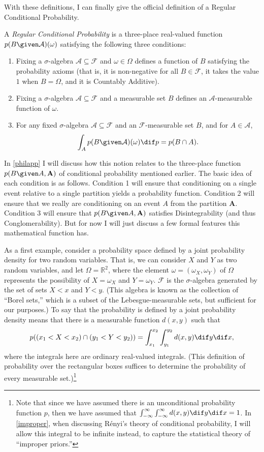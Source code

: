 With these definitions, I can finally give the official definition of a Regular Conditional Probability.
\begin{definition}\label{rcd}
A \emph{Regular Conditional Probability} is a three-place real-valued function $p(B \given \mathcal{A})(\omega)$ satisfying the following three conditions:\begin{enumerate}
\item Fixing a $\sigma$-algebra $\mathcal{A}\subseteq\mathcal{F}$ and $\omega\in\Omega$ defines a function of $B$ satisfying the probability axioms (that is, it is non-negative for all $B\in\mathcal{F}$, it takes the value $1$ when $B=\Omega$, and it is Countably Additive).
\item Fixing a $\sigma$-algebra $\mathcal{A}\subseteq\mathcal{F}$ and a measurable set $B$ defines an $\mathcal{A}$-measurable function of $\omega$.
\item For any fixed $\sigma$-algebra $\mathcal{A}\subseteq\mathcal{F}$ and an $\mathcal{F}$-measurable set $B$, and for $A\in\mathcal{A}$, $$\int_A p(B \given \mathcal{A})(\omega) \dif p=p(B\cap A).$$
\end{enumerate}
\end{definition}
In \autoref{philapp} I will discuss how this notion relates to the three-place function $p(B \given A,\mathbf{A})$ of conditional probability mentioned earlier. The basic idea of each condition is as follows. Condition 1 will ensure that conditioning on a single event relative to a single partition yields a  probability function. Condition 2 will ensure that we really are conditioning on an event $A$ from the partition $\mathbf{A}$. Condition 3 will ensure that $p(B \given A,\mathbf{A})$ satisfies Disintegrability (and thus Conglomerability). But for now I will just discuss a few formal features this mathematical function has.

As a first example, consider a probability space defined by a joint probability density for two random variables. That is, we can consider $X$ and $Y$ as two random variables, and let $\Omega=\mathbb{R}^2$, where the element $\omega=(\omega_X,\omega_Y)$ of $\Omega$ represents the possibility of $X=\omega_X$ and $Y=\omega_Y$. $\mathcal{F}$ is the $\sigma$-algebra generated by the set of sets $X<x$ and $Y<y$. (This algebra is known as the collection of ``Borel sets,'' which is a subset of the Lebesgue-measurable sets, but sufficient for our purposes.) To say that the probability is defined by a joint probability density means that there is a measurable function $d(x,y)$ such that
$$p((x_1<X<x_2)\cap(y_1<Y<y_2))=\int_{x_1}^{x_2}\int_{y_1}^{y_2} d(x,y) \dif y \dif x,$$
where the integrals here are ordinary real-valued integrals. (This definition of probability over the rectangular boxes suffices to determine the probability of every measurable set.)\footnote{Note that since we have assumed there is an unconditional probability function $p$, then we have assumed that $\int_{-\infty}^{\infty}\int_{-\infty}^{\infty}d(x,y) \dif y \dif x=1$. In \autoref{improper}, when discussing R\'{e}nyi's theory of conditional probability, I will allow this integral to be infinite instead, to capture the statistical theory of ``improper priors.''}

